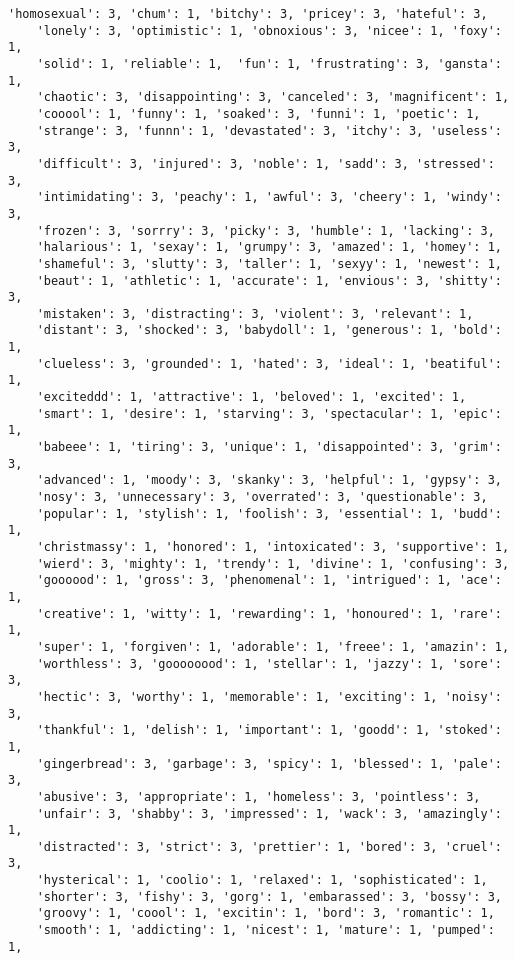 \begin{lstlisting}[caption={\textit{sentiment\_words.py}: sentiment words}]
    'homosexual': 3, 'chum': 1, 'bitchy': 3, 'pricey': 3, 'hateful': 3,
    'lonely': 3, 'optimistic': 1, 'obnoxious': 3, 'nicee': 1, 'foxy': 1,
    'solid': 1, 'reliable': 1,  'fun': 1, 'frustrating': 3, 'gansta': 1,
    'chaotic': 3, 'disappointing': 3, 'canceled': 3, 'magnificent': 1,
    'cooool': 1, 'funny': 1, 'soaked': 3, 'funni': 1, 'poetic': 1,
    'strange': 3, 'funnn': 1, 'devastated': 3, 'itchy': 3, 'useless': 3,
    'difficult': 3, 'injured': 3, 'noble': 1, 'sadd': 3, 'stressed': 3,
    'intimidating': 3, 'peachy': 1, 'awful': 3, 'cheery': 1, 'windy': 3,
    'frozen': 3, 'sorrry': 3, 'picky': 3, 'humble': 1, 'lacking': 3,
    'halarious': 1, 'sexay': 1, 'grumpy': 3, 'amazed': 1, 'homey': 1,
    'shameful': 3, 'slutty': 3, 'taller': 1, 'sexyy': 1, 'newest': 1,
    'beaut': 1, 'athletic': 1, 'accurate': 1, 'envious': 3, 'shitty': 3,
    'mistaken': 3, 'distracting': 3, 'violent': 3, 'relevant': 1,
    'distant': 3, 'shocked': 3, 'babydoll': 1, 'generous': 1, 'bold': 1,
    'clueless': 3, 'grounded': 1, 'hated': 3, 'ideal': 1, 'beatiful': 1,
    'exciteddd': 1, 'attractive': 1, 'beloved': 1, 'excited': 1,
    'smart': 1, 'desire': 1, 'starving': 3, 'spectacular': 1, 'epic': 1,
    'babeee': 1, 'tiring': 3, 'unique': 1, 'disappointed': 3, 'grim': 3,
    'advanced': 1, 'moody': 3, 'skanky': 3, 'helpful': 1, 'gypsy': 3,
    'nosy': 3, 'unnecessary': 3, 'overrated': 3, 'questionable': 3,
    'popular': 1, 'stylish': 1, 'foolish': 3, 'essential': 1, 'budd': 1,
    'christmassy': 1, 'honored': 1, 'intoxicated': 3, 'supportive': 1,
    'wierd': 3, 'mighty': 1, 'trendy': 1, 'divine': 1, 'confusing': 3,
    'goooood': 1, 'gross': 3, 'phenomenal': 1, 'intrigued': 1, 'ace': 1,
    'creative': 1, 'witty': 1, 'rewarding': 1, 'honoured': 1, 'rare': 1,
    'super': 1, 'forgiven': 1, 'adorable': 1, 'freee': 1, 'amazin': 1,
    'worthless': 3, 'goooooood': 1, 'stellar': 1, 'jazzy': 1, 'sore': 3,
    'hectic': 3, 'worthy': 1, 'memorable': 1, 'exciting': 1, 'noisy': 3,
    'thankful': 1, 'delish': 1, 'important': 1, 'goodd': 1, 'stoked': 1,
    'gingerbread': 3, 'garbage': 3, 'spicy': 1, 'blessed': 1, 'pale': 3,
    'abusive': 3, 'appropriate': 1, 'homeless': 3, 'pointless': 3,
    'unfair': 3, 'shabby': 3, 'impressed': 1, 'wack': 3, 'amazingly': 1,
    'distracted': 3, 'strict': 3, 'prettier': 1, 'bored': 3, 'cruel': 3,
    'hysterical': 1, 'coolio': 1, 'relaxed': 1, 'sophisticated': 1,
    'shorter': 3, 'fishy': 3, 'gorg': 1, 'embarassed': 3, 'bossy': 3,
    'groovy': 1, 'coool': 1, 'excitin': 1, 'bord': 3, 'romantic': 1,
    'smooth': 1, 'addicting': 1, 'nicest': 1, 'mature': 1, 'pumped': 1,

\end{lstlisting}
